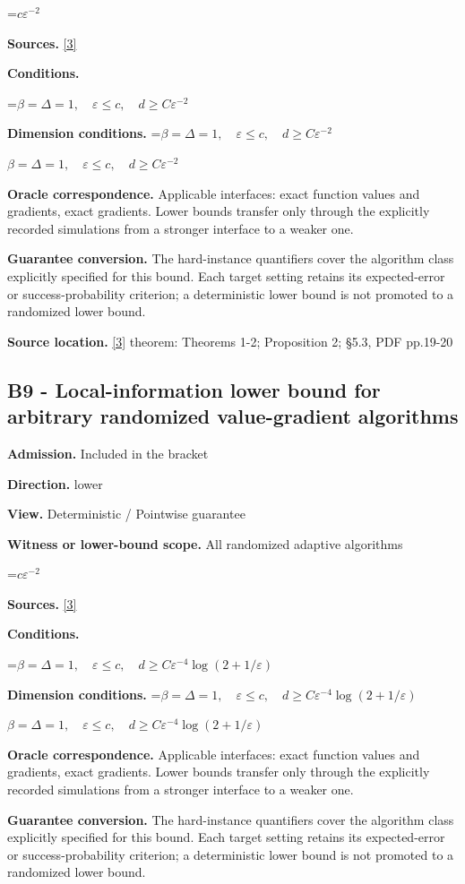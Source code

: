 \documentclass[10pt,a4paper]{article}
\newcommand{\AtlasMath}[1]{\par\begingroup\centering\setbox0=\hbox{$\displaystyle #1$}\ifdim\wd0>1.4\linewidth\typeout{ATLAS WIDE FORMULA: \the\wd0}\fi\ifdim\wd0>\linewidth\resizebox{\linewidth}{!}{\box0}\else\box0\fi\par\endgroup}
\newcommand{\AtlasInlineMath}[1]{\begingroup\setbox0=\hbox{$#1$}\ifdim\wd0>.4\linewidth\endgroup\AtlasMath{#1}\else\endgroup$#1$\fi}
\begin{document}
\AtlasMath{c\varepsilon^{-2}}
\textbf{Sources.} \href{https://arxiv.org/pdf/1710.11606}{[3]}

\textbf{Conditions.} 
\AtlasMath{\beta=\Delta=1,\quad\varepsilon\le c,\quad d\ge C\varepsilon^{-2}}


\textbf{Dimension conditions.} \AtlasInlineMath{\beta=\Delta=1,\quad\varepsilon\le c,\quad d\ge C\varepsilon^{-2}}

\textbf{Oracle correspondence.} Applicable interfaces: exact function values and gradients, exact gradients. Lower bounds transfer only through the explicitly recorded simulations from a stronger interface to a weaker one.

\textbf{Guarantee conversion.} The hard-instance quantifiers cover the algorithm class explicitly specified for this bound. Each target setting retains its expected-error or success-probability criterion; a deterministic lower bound is not promoted to a randomized lower bound.

\textbf{Source location.} \href{https://arxiv.org/pdf/1710.11606}{[3]} theorem: Theorems 1-2; Proposition 2; §5.3, PDF pp.19-20

\subsection{B9 - Local-information lower bound for arbitrary randomized value-gradient algorithms}
\textbf{Admission.} Included in the bracket

\textbf{Direction.} lower

\textbf{View.} Deterministic / Pointwise guarantee

\textbf{Witness or lower-bound scope.} All randomized adaptive algorithms

\AtlasMath{c\varepsilon^{-2}}
\textbf{Sources.} \href{https://arxiv.org/pdf/1710.11606}{[3]}

\textbf{Conditions.} 
\AtlasMath{\beta=\Delta=1,\quad\varepsilon\le c,\quad d\ge C\varepsilon^{-4}\log(2+1/\varepsilon)}


\textbf{Dimension conditions.} \AtlasInlineMath{\beta=\Delta=1,\quad\varepsilon\le c,\quad d\ge C\varepsilon^{-4}\log(2+1/\varepsilon)}

\textbf{Oracle correspondence.} Applicable interfaces: exact function values and gradients, exact gradients. Lower bounds transfer only through the explicitly recorded simulations from a stronger interface to a weaker one.

\textbf{Guarantee conversion.} The hard-instance quantifiers cover the algorithm class explicitly specified for this bound. Each target setting retains its expected-error or success-probability criterion; a deterministic lower bound is not promoted to a randomized lower bound.
\end{document}
